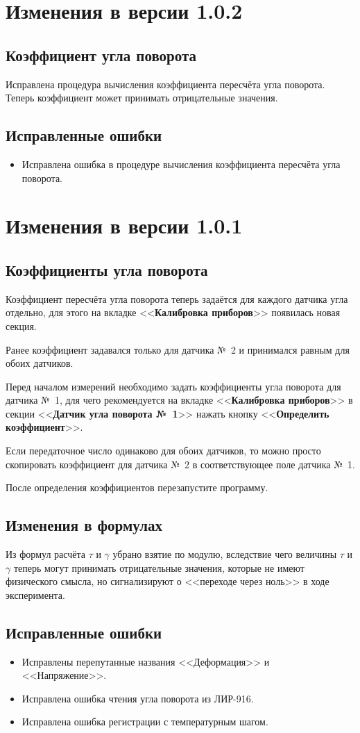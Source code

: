 \documentclass[12pt, a4paper]{article}
\newcommand{\CTRL}[1]{<<{\bf #1}>>}
\newcommand{\VERSION}[1]{\section*{Изменения в версии #1}}
\newcommand{\ITEM}[1]{\subsection*{#1}}
\newcommand{\FIXEDERRORS}{\subsection*{Исправленные ошибки}}
\begin{document}
\VERSION{1.0.2}

\ITEM{Коэффициент угла поворота}

Исправлена процедура вычисления коэффициента пересчёта угла поворота. Теперь коэффициент может принимать отрицательные значения.

\FIXEDERRORS

\begin{itemize}
\item Исправлена ошибка в процедуре вычисления коэффициента пересчёта угла поворота.
\end{itemize}

\VERSION{1.0.1}

\ITEM{Коэффициенты угла поворота}

Коэффициент пересчёта угла поворота теперь задаётся для каждого датчика угла отдельно, для этого на вкладке \CTRL{Калибровка приборов} появилась новая секция.

Ранее коэффициент задавался только для датчика №~2 и принимался равным для обоих датчиков.

Перед началом измерений необходимо задать коэффициенты угла поворота для датчика №~1, для чего рекомендуется на вкладке \CTRL{Калибровка приборов} в секции \CTRL{Датчик угла поворота №~1} нажать кнопку \CTRL{Определить коэффициент}.

Если передаточное число одинаково для обоих датчиков, то можно просто скопировать коэффициент для датчика №~2 в соответствующее поле датчика №~1.

После определения коэффициентов перезапустите программу.

\ITEM{Изменения в формулах}

Из формул расчёта $\tau$ и $\gamma$ убрано взятие по модулю, вследствие чего величины $\tau$ и $\gamma$ теперь могут принимать отрицательные значения, которые не имеют физического смысла, но сигнализируют о <<переходе через ноль>> в ходе эксперимента.

\FIXEDERRORS

\begin{itemize}
\item Исправлены перепутанные названия <<Деформация>> и <<Напряжение>>.
\item Исправлена ошибка чтения угла поворота из ЛИР-916.
\item Исправлена ошибка регистрации с температурным шагом.
\end{itemize}
\end{document}
